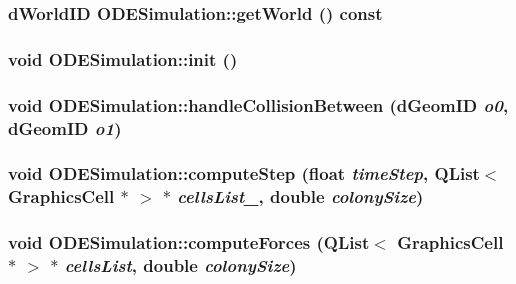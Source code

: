 \subsubsection{\setlength{\rightskip}{0pt plus 5cm}dWorldID ODESimulation::getWorld () const}\label{classODESimulation_9320cdf91a7e002119eb0cb0bba9c7b0}


\subsubsection{\setlength{\rightskip}{0pt plus 5cm}void ODESimulation::init ()}\label{classODESimulation_83fbf3e98bab325948da3e4d1b3f3848}


\subsubsection{\setlength{\rightskip}{0pt plus 5cm}void ODESimulation::handleCollisionBetween (dGeomID {\em o0}, \/  dGeomID {\em o1})}\label{classODESimulation_5a72dab563d6c80d6643c1f940bb3349}


\subsubsection{\setlength{\rightskip}{0pt plus 5cm}void ODESimulation::computeStep (float {\em timeStep}, \/  QList$<$ {\bf GraphicsCell} $\ast$ $>$ $\ast$ {\em cellsList\_\-}, \/  double {\em colonySize})\hspace{0.3cm}{\tt  [protected, virtual]}}\label{classODESimulation_0ad30fc1a7f5f74ef836780f7b5b8eb0}


\subsubsection{\setlength{\rightskip}{0pt plus 5cm}void ODESimulation::computeForces (QList$<$ {\bf GraphicsCell} $\ast$ $>$ $\ast$ {\em cellsList}, \/  double {\em colonySize})\hspace{0.3cm}{\tt  [protected]}}\label{classODESimulation_001f1932d1d2e44237ef209d69666dc5}




